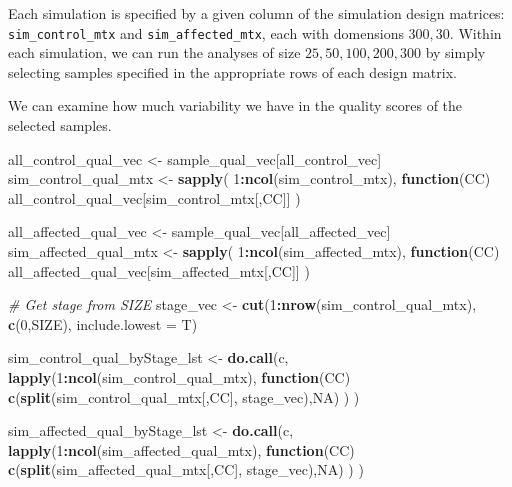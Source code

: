 \documentclass[
]{book}
\newenvironment{Shaded}{\begin{snugshade}}{\end{snugshade}}
\newcommand{\CommentTok}[1]{\textcolor[rgb]{0.56,0.35,0.01}{\textit{#1}}}
\newcommand{\ControlFlowTok}[1]{\textcolor[rgb]{0.13,0.29,0.53}{\textbf{#1}}}
\newcommand{\DataTypeTok}[1]{\textcolor[rgb]{0.13,0.29,0.53}{#1}}
\newcommand{\DecValTok}[1]{\textcolor[rgb]{0.00,0.00,0.81}{#1}}
\newcommand{\KeywordTok}[1]{\textcolor[rgb]{0.13,0.29,0.53}{\textbf{#1}}}
\newcommand{\NormalTok}[1]{#1}
\newcommand{\OperatorTok}[1]{\textcolor[rgb]{0.81,0.36,0.00}{\textbf{#1}}}
\newcommand{\OtherTok}[1]{\textcolor[rgb]{0.56,0.35,0.01}{#1}}
\newcommand{\StringTok}[1]{\textcolor[rgb]{0.31,0.60,0.02}{#1}}
\begin{document}
Each simulation is specified by a given column of the simulation design matrices:
\texttt{sim\_control\_mtx} and \texttt{sim\_affected\_mtx}, each with domensions \(300, 30\).
Within each simulation, we can run the analyses of size \(25, 50, 100, 200, 300\) by simply selecting
samples specified in the appropriate rows of each design matrix.

We can examine how much variability we have in the quality scores of the selected samples.

\begin{Shaded}
\begin{Highlighting}[]
\NormalTok{all\_control\_qual\_vec <{-}}\StringTok{ }\NormalTok{sample\_qual\_vec[all\_control\_vec]}
\NormalTok{sim\_control\_qual\_mtx <{-}}\StringTok{ }\KeywordTok{sapply}\NormalTok{(}
  \DecValTok{1}\OperatorTok{:}\KeywordTok{ncol}\NormalTok{(sim\_control\_mtx), }
  \ControlFlowTok{function}\NormalTok{(CC) all\_control\_qual\_vec[sim\_control\_mtx[,CC]]}
\NormalTok{ )}

\NormalTok{all\_affected\_qual\_vec <{-}}\StringTok{ }\NormalTok{sample\_qual\_vec[all\_affected\_vec]}
\NormalTok{sim\_affected\_qual\_mtx <{-}}\StringTok{ }\KeywordTok{sapply}\NormalTok{(}
  \DecValTok{1}\OperatorTok{:}\KeywordTok{ncol}\NormalTok{(sim\_affected\_mtx),  }
  \ControlFlowTok{function}\NormalTok{(CC) all\_affected\_qual\_vec[sim\_affected\_mtx[,CC]]}
\NormalTok{ )}

\CommentTok{\# Get stage from SIZE }
\NormalTok{stage\_vec <{-}}\StringTok{ }\KeywordTok{cut}\NormalTok{(}\DecValTok{1}\OperatorTok{:}\KeywordTok{nrow}\NormalTok{(sim\_control\_qual\_mtx), }\KeywordTok{c}\NormalTok{(}\DecValTok{0}\NormalTok{,SIZE), }\DataTypeTok{include.lowest =}\NormalTok{ T)}

\NormalTok{sim\_control\_qual\_byStage\_lst <{-}}\StringTok{ }\KeywordTok{do.call}\NormalTok{(}\StringTok{\textquotesingle{}c\textquotesingle{}}\NormalTok{, }
 \KeywordTok{lapply}\NormalTok{(}\DecValTok{1}\OperatorTok{:}\KeywordTok{ncol}\NormalTok{(sim\_control\_qual\_mtx), }
  \ControlFlowTok{function}\NormalTok{(CC) }\KeywordTok{c}\NormalTok{(}\KeywordTok{split}\NormalTok{(sim\_control\_qual\_mtx[,CC], stage\_vec),}\OtherTok{NA}\NormalTok{)}
\NormalTok{ )}
\NormalTok{)}

\NormalTok{sim\_affected\_qual\_byStage\_lst <{-}}\StringTok{ }\KeywordTok{do.call}\NormalTok{(}\StringTok{\textquotesingle{}c\textquotesingle{}}\NormalTok{, }
 \KeywordTok{lapply}\NormalTok{(}\DecValTok{1}\OperatorTok{:}\KeywordTok{ncol}\NormalTok{(sim\_affected\_qual\_mtx), }
  \ControlFlowTok{function}\NormalTok{(CC) }\KeywordTok{c}\NormalTok{(}\KeywordTok{split}\NormalTok{(sim\_affected\_qual\_mtx[,CC], stage\_vec),}\OtherTok{NA}\NormalTok{)}
\NormalTok{ )}
\NormalTok{)}


\end{Highlighting}
\end{Shaded}
\end{document}
